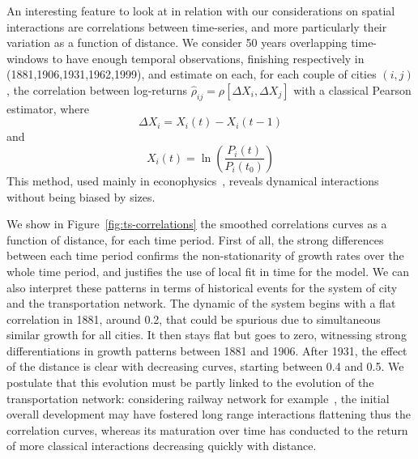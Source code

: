 \documentclass[Royal,sageh,times]{sagej}
\begin{document}
An interesting feature to look at in relation with our considerations on spatial interactions are correlations between time-series, and more particularly their variation as a function of distance. We consider 50 years overlapping time-windows to have enough temporal observations, finishing respectively in (1881,1906,1931,1962,1999), and estimate on each, for each couple of cities $(i,j)$, the correlation between log-returns $\hat{\rho}_{ij}=\rho\left[\Delta X_i, \Delta X_j\right]$ with a classical Pearson estimator, where
\[\Delta X_i = X_i(t) - X_i(t-1)\]
and
\[X_i(t) = \ln\left(\frac{P_i(t)}{P_i(t_0)}\right)\]
This method, used mainly in econophysics~\citep{mantegna1999introduction}, reveals dynamical interactions without being biased by sizes.

We show in Figure~\ref{fig:ts-correlations} the smoothed correlations curves as a function of distance, for each time period. First of all, the strong differences between each time period confirms the non-stationarity of growth rates over the whole time period, and justifies the use of local fit in time for the model. We can also interpret these patterns in terms of historical events for the system of city and the transportation network. The dynamic of the system begins with a flat correlation in 1881, around 0.2, that could be spurious due to simultaneous similar growth for all cities. It then stays flat but goes to zero, witnessing strong differentiations in growth patterns between 1881 and 1906. After 1931, the effect of the distance is clear with decreasing curves, starting between 0.4 and 0.5. We postulate that this evolution must be partly linked to the evolution of the transportation network: considering railway network for example~\citep{thevenin2013mapping}, the initial overall development may have fostered long range interactions flattening thus the correlation curves, whereas its maturation over time has conducted to the return of more classical interactions decreasing quickly with distance.
\end{document}
